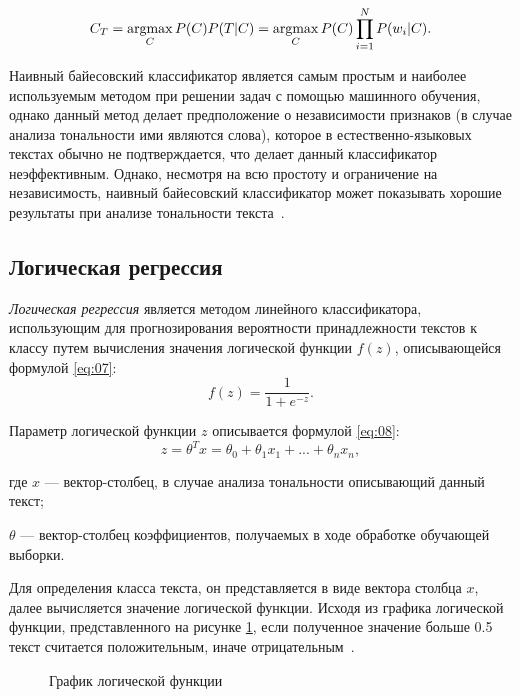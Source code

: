 \begin{equation}\label{eq:06}
    C_T = \operatorname*{argmax}_C P(C)P(T|C) = \operatorname*{argmax}_C P(C)\prod\limits_{i=1}^{N} P(w_i|C).
\end{equation}

Наивный байесовский классификатор является самым простым и наиболее
используемым методом при решении задач с помощью машинного обучения,
однако данный метод делает предположение о независимости признаков (в случае
анализа тональности ими являются слова), которое в естественно-языковых текстах
обычно не подтверждается, что делает данный классификатор неэффективным.
Однако, несмотря на всю простоту и ограничение на независимость, наивный
байесовский классификатор может показывать хорошие результаты при анализе
тональности текста~\cite{article05}.

\subsection{Логическая регрессия}

\textit{Логическая регрессия} является методом линейного классификатора,
использующим для прогнозирования вероятности принадлежности текстов к классу
путем вычисления значения логической функции $f(z)$, описывающейся формулой
\ref{eq:07}:
\begin{equation}\label{eq:07}
    f(z) = \frac{1}{1+e^{-z}}.
\end{equation}

Параметр логической функции $z$ описывается формулой \ref{eq:08}:
\begin{equation}\label{eq:08}
    z = \theta^Tx=\theta_0+\theta_1x_1+...+\theta_nx_n,
\end{equation}

где $x$ --- вектор-столбец, в случае анализа тональности описывающий данный
текст;

$\theta$ --- вектор-столбец коэффициентов, получаемых в ходе обработке
обучающей выборки.

Для определения класса текста, он представляется в виде вектора столбца $x$,
далее вычисляется значение логической функции. Исходя из графика логической
функции, представленного на рисунке \ref{img:01}, если полученное значение
больше 0.5 текст считается положительным, иначе отрицательным~\cite{article22}.

\begin{figure}[h!]
    \begin{center}
    \end{center}
    \caption{График логической функции}\label{img:01}
\end{figure}

